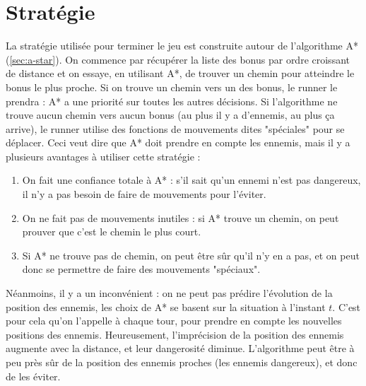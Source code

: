 \chapter{Stratégie}
\label{cp:strategie}

La stratégie utilisée pour terminer le jeu est construite autour de l'algorithme A* (\autoref{sec:a-star}).
\newline
On commence par récupérer la liste des bonus par ordre croissant de distance et on essaye, en utilisant A*, de trouver un chemin pour atteindre le bonus le plus proche.
\newline
Si on trouve un chemin vers un des bonus, le runner le prendra : A* a une priorité sur toutes les autres décisions.
\newline
Si l'algorithme ne trouve aucun chemin vers aucun bonus (au plus il y a d'ennemis, au plus ça arrive), le runner utilise des fonctions de mouvements dites "spéciales" pour se déplacer.
\newline\newline
Ceci veut dire que A* doit prendre en compte les ennemis, mais il y a plusieurs avantages à utiliser cette stratégie :

\begin{enumerate}
    \item On fait une confiance totale à A* : s'il sait qu'un ennemi n'est pas dangereux, il n'y a pas besoin de faire de mouvements pour l'éviter.
    \item On ne fait pas de mouvements inutiles : si A* trouve un chemin, on peut prouver que c'est le chemin le plus court.
    \item Si A* ne trouve pas de chemin, on peut être sûr qu'il n'y en a pas, et on peut donc se permettre de faire des mouvements "spéciaux".
\end{enumerate}
Néanmoins, il y a un inconvénient : on ne peut pas prédire l'évolution de la position des ennemis, les choix de A* se basent sur la situation à l'instant $t$.
C'est pour cela qu'on l'appelle à chaque tour, pour prendre en compte les nouvelles positions des ennemis.
\newline\newline
Heureusement, l'imprécision de la position des ennemis augmente avec la distance, et leur dangerosité diminue.
L'algorithme peut être à peu près sûr de la position des ennemis proches (les ennemis dangereux), et donc de les éviter.

\newpage

